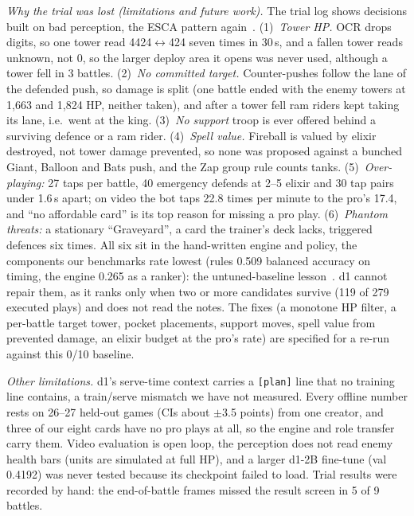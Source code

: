 \documentclass[conference]{IEEEtran}
\newcommand{\tw}[1]{\texttt{#1}}
\begin{document}
\emph{Why the trial was lost (limitations and future work).} The trial log shows decisions built on bad perception, the ESCA pattern again~\cite{huang2025esca}. (1)~\emph{Tower HP.} OCR drops digits, so one tower read 4424$\leftrightarrow$424 seven times in 30\,s, and a fallen tower reads unknown, not 0, so the larger deploy area it opens was never used, although a tower fell in 3 battles. (2)~\emph{No committed target.} Counter-pushes follow the lane of the defended push, so damage is split (one battle ended with the enemy towers at 1,663 and 1,824 HP, neither taken), and after a tower fell ram riders kept taking its lane, i.e.\ went at the king. (3)~\emph{No support} troop is ever offered behind a surviving defence or a ram rider. (4)~\emph{Spell value.} Fireball is valued by elixir destroyed, not tower damage prevented, so none was proposed against a bunched Giant, Balloon and Bats push, and the Zap group rule counts tanks. (5)~\emph{Over-playing:} 27 taps per battle, 40 emergency defends at 2--5 elixir and 30 tap pairs under 1.6\,s apart; on video the bot taps 22.8 times per minute to the pro's 17.4, and ``no affordable card'' is its top reason for missing a pro play. (6)~\emph{Phantom threats:} a stationary ``Graveyard'', a card the trainer's deck lacks, triggered defences six times. All six sit in the hand-written engine and policy, the components our benchmarks rate lowest (rules 0.509 balanced accuracy on timing, the engine 0.265 as a ranker): the untuned-baseline lesson~\cite{rendle2020ncfvsmf}. d1 cannot repair them, as it ranks only when two or more candidates survive (119 of 279 executed plays) and does not read the notes. The fixes (a monotone HP filter, a per-battle target tower, pocket placements, support moves, spell value from prevented damage, an elixir budget at the pro's rate) are specified for a re-run against this 0/10 baseline. %

\emph{Other limitations.} d1's serve-time context carries a \tw{[plan]} line that no training line contains, a train/serve mismatch we have not measured. Every offline number rests on 26--27 held-out games (CIs about $\pm$3.5 points) from one creator, and three of our eight cards have no pro plays at all, so the engine and role transfer carry them. Video evaluation is open loop, the perception does not read enemy health bars (units are simulated at full HP), and a larger d1-2B fine-tune (val 0.4192) was never tested because its checkpoint failed to load. Trial results were recorded by hand: the end-of-battle frames missed the result screen in 5 of 9 battles. %
\end{document}
